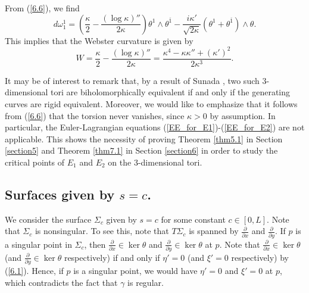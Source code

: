\documentclass{amsart}
\theoremstyle{Corollary}
\numberwithin{equation}{section}
\begin{document}
From (\ref{6.6}), we find 
\begin{equation*}
d\omega_1^1=
\left(\frac{\kappa}{2}-\frac{(\log\kappa)''}{2\kappa}\right)\theta^1\wedge\theta^{\overline{1}}
-\frac{i\kappa'}{\sqrt{2\kappa}}(\theta^1+\theta^{\overline{1}})\wedge\theta.
\end{equation*}
This implies that the Webster curvature is given by 
\begin{equation}\label{6.7}
W=\frac{\kappa}{2}-\frac{(\log\kappa)''}{2\kappa}
=\frac{\kappa^4-\kappa\kappa''+(\kappa')^2}{2\kappa^3}.
\end{equation}

It may be of interest to remark that, by a result of Sunada \cite{Sunada}, two
such $3$-dimensional tori  are biholomorphically equivalent if and only if
the generating curves are rigid equivalent.
Moreover, we would like to emphasize that 
 it follows from (\ref{6.6}) that the torsion never vanishes, 
 since $\kappa>0$ by assumption. 
In particular, the Euler-Lagrangian equations 
(\ref{EE_for_E1})-(\ref{EE_for_E2}) are not applicable. 
This shows the necessity of proving 
Theorem \ref{thm5.1} in Section \ref{section5} and Theorem \ref{thm7.1}
in Section \ref{section6} in order to study the critical points of $E_1$ and $E_2$ 
on the $3$-dimensional tori. 
 
 


\subsection{Surfaces given by $s=c$.}
We consider the surface $\Sigma_c$ given by $s=c$ for some constant $c\in [0,L]$. 
Note that $\Sigma_c$ is nonsingular. To see this, note that 
$T\Sigma_c$ is spanned by $\displaystyle\frac{\partial}{\partial x}$ 
and $\displaystyle\frac{\partial}{\partial y}$. 
If $p$ is a singular point in $\Sigma_c$, then $\displaystyle\frac{\partial}{\partial x}\in\ker\theta$
and  $\displaystyle\frac{\partial}{\partial y}\in\ker\theta$
at $p$. 
Note that $\displaystyle\frac{\partial}{\partial x}\in\ker\theta$
(and  $\displaystyle\frac{\partial}{\partial y}\in\ker\theta$ respectively)
if and only if 
$\eta'=0$
 (and $\xi'=0$ respectively) by (\ref{6.1}).
Hence, if $p$ is a singular point, we would have 
$\eta'=0$ and $\xi'=0$ at $p$, which contradicts the fact that $\gamma$ is regular. 
\end{document}
